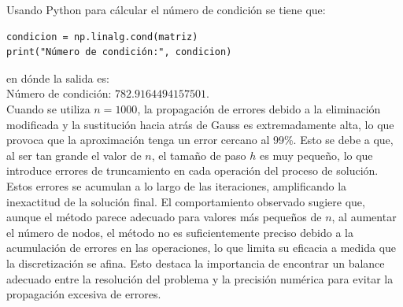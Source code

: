 \begin{homeworkProblem}
\begin{solucion}
\begin{enumerate}[a)]
\begin{center}
          \end{center}
          \newpage
          Usando Python para cálcular el número de condición se tiene que:
          \begin{lstlisting}
condicion = np.linalg.cond(matriz)
print("Número de condición:", condicion)  
          \end{lstlisting}
          en dónde la salida es:\\
          Número de condición: $782.9164494157501$.\\
          Cuando se utiliza \( n = 1000 \), la propagación de errores debido a la eliminación modificada y la sustitución hacia atrás de Gauss es extremadamente alta, lo que provoca que la aproximación tenga un error cercano al 99\%. Esto se debe a que, al ser tan grande el valor de \( n \), el tamaño de paso \( h \) es muy pequeño, lo que introduce errores de truncamiento en cada operación del proceso de solución. Estos errores se acumulan a lo largo de las iteraciones, amplificando la inexactitud de la solución final. 
          El comportamiento observado sugiere que, aunque el método parece adecuado para valores más pequeños de \( n \), al aumentar el número de nodos, el método no es suficientemente preciso debido a la acumulación de errores en las operaciones, lo que limita su eficacia a medida que la discretización se afina. Esto destaca la importancia de encontrar un balance adecuado entre la resolución del problema y la precisión numérica para evitar la propagación excesiva de errores.
    \end{enumerate}
  \end{solucion}
\end{homeworkProblem}
